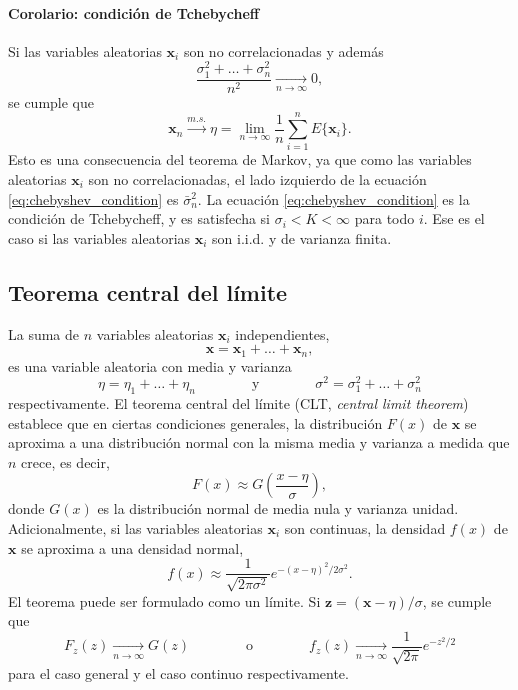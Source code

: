 \documentclass[a4paper]{report}
\newcommand{\x}{\mathbf{x}}
\newcommand{\z}{\mathbf{z}}
\begin{document}
\paragraph{Corolario: condición de Tchebycheff} Si las variables aleatorias \(\x_i\) son no correlacionadas y además
\begin{equation}\label{eq:chebyshev_condition}
 \frac{\sigma^2_1+\dots+\sigma^2_n}{n^2}\xrightarrow[n\to\infty]{}0,
\end{equation}
se cumple que 
\[
 \x_n\xrightarrow[]{m.s.}\eta=\lim_{n\to\infty}\frac{1}{n}\sum_{i=1}^nE\{\x_i\}.
\]
Esto es una consecuencia del teorema de Markov, ya que como las variables aleatorias \(\x_i\) son no correlacionadas, el lado izquierdo de la ecuación \ref{eq:chebyshev_condition} es \(\bar{\sigma}^2_n\). La ecuación \ref{eq:chebyshev_condition} es la condición de Tchebycheff, y es satisfecha si \(\sigma_i<K<\infty\) para todo \(i\). Ese es el caso si las variables aleatorias \(\x_i\) son i.i.d. y de varianza finita.

\subsection{Teorema central del límite}

La suma de \(n\) variables aleatorias \(\x_i\) independientes,
\[
 \x=\x_1+\dots+\x_n,
\]
es una variable aleatoria con media y varianza
\begin{equation}\label{eq:clt_mean_and_variance}
 \eta=\eta_1+\dots+\eta_n\qquad\qquad\textrm{y}\qquad\qquad\sigma^2=\sigma^2_1+\dots+\sigma^2_n
\end{equation}
respectivamente. El teorema central del límite (CLT, \emph{central limit theorem}) establece que en ciertas condiciones generales, la distribución \(F(x)\) de \(\x\) se aproxima a una distribución normal con la misma media y varianza a medida que \(n\) crece, es decir,
\[
 F(x)\approx G\left(\frac{x-\eta}{\sigma}\right),
\]
donde \(G(x)\) es la distribución normal de media nula y varianza unidad.
Adicionalmente, si las variables aleatorias \(\x_i\) son continuas, la densidad \(f(x)\) de \(\x\) se aproxima a una densidad normal,
\begin{equation}\label{eq:central_limit_theorem_density}
 f(x)\approx\frac{1}{\sqrt{2\pi\sigma^2}}e^{-(x-\eta)^2/2\sigma^2}.
\end{equation}
El teorema puede ser formulado como un límite. Si \(\z=(\x-\eta)/\sigma\), se cumple que 
\[
 F_z(z)\xrightarrow[n\to\infty]{}G(z)
 \qquad\qquad\textrm{o}\qquad\qquad
 f_z(z)\xrightarrow[n\to\infty]{}\frac{1}{\sqrt{2\pi}}e^{-z^2/2}
\]
para el caso general y el caso continuo respectivamente.
\end{document}
